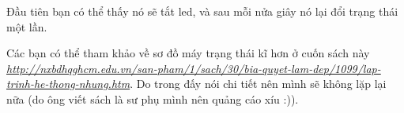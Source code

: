 Đầu tiên bạn có thể thấy nó sẽ tắt led, và sau mỗi nửa giây nó lại đổi trạng thái một lần.

Các bạn có thể tham khảo về sơ đồ máy trạng thái kĩ hơn ở cuốn sách này \textit{\url{http://nxbdhqghcm.edu.vn/san-pham/1/sach/30/bia-quyet-lam-dep/1099/lap-trinh-he-thong-nhung.htm}}. Do trong đấy nói chi tiết nên mình sẽ không lặp lại nữa (do ông viết sách là sư phụ mình nên quảng cáo xíu :)).

